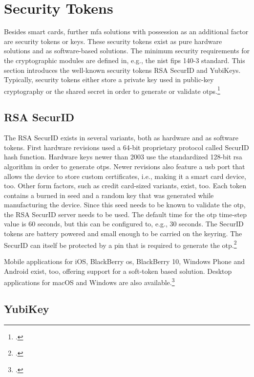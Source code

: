 \section{Security Tokens}

Besides smart cards, further \gls{mfa} solutions with possession as an additional factor are security tokens or keys. These security tokens exist as pure hardware solutions and as software-based solutions. The minimum security requirements for the cryptographic modules are defined in, e.g., the \gls{nist} \gls{fips} 140-3 standard. This section introduces the well-known security tokens \frqq RSA SecurID\flqq{} and \frqq YubiKeys\flqq. Typically, security tokens either store a private key used in public-key cryptography or the shared secret in order to generate or validate \glspl{otp}.\footcites[See][]{FIPS140-3}[See][Chapter 28.4.3]{1174011}

\subsection{RSA SecurID}

The RSA SecurID exists in several variants, both as hardware and as software tokens. First hardware revisions used a 64-bit proprietary protocol called \frqq SecurID hash function\flqq. Hardware keys newer than 2003 use the standardized 128-bit \gls{rsa} algorithm in order to generate \glspl{otp}. Newer revisions also feature a \gls{usb} port that allows the device to store custom certificates, i.e., making it a smart card device, too. Other form factors, such as credit card-sized variants, exist, too. Each token contains a burned in seed and a random key that was generated while manufacturing the device. Since this seed needs to be known to validate the \gls{otp}, the RSA SecurID server needs to be used. The default time for the \gls{otp} time-step value is 60 seconds, but this can be configured to, e.g., 30 seconds. The SecurID tokens are battery powered and small enough to be carried on the keyring. The SecurID can itself be protected by a \gls{pin} that is required to generate the \gls{otp}.\footcites[See][479--480]{eckert-it-sec-9}[See][296]{4351500}

Mobile applications for iOS, BlackBerry \gls{os}, BlackBerry 10, Windows Phone and Android exist, too, offering support for a soft-token based solution. Desktop applications for macOS and Windows are also available.\footcites[See][3--6]{ibm-mfa}[See][49]{5542954}

\subsection{YubiKey}

